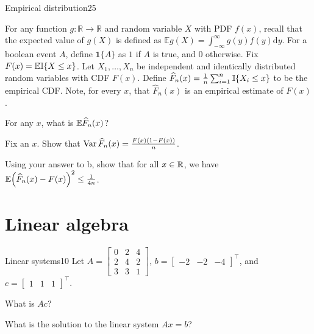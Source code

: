 \documentclass{article}
\begin{document}
\begin{problem}{Empirical distribution}{25}


For any function $g \colon \mathbb{R} \to \mathbb{R}$ and random variable $X$ with PDF $f(x)$, recall that the expected value of $g(X)$ is defined as $\mathbb{E}{g(X)} = \int_{-\infty}^\infty g(y) f(y) \mathrm{d} y$. For a boolean event $A$, define $\mathbf{1}\{ A \}$ as $1$ if $A$ is true, and $0$ otherwise. Fix $F(x) = \mathbb{E}{\mathbb{I}\{X \leq x\}}$. Let $X_1,\ldots,X_n$ be independent and identically distributed random variables with CDF $F(x)$. Define $\widehat{F}_n(x) = \frac{1}{n} \sum_{i=1}^n \mathbb{I}\{X_i \leq x\}$ to be the empirical CDF. Note, for every $x$, that $\widehat{F}_n(x)$ is an empirical estimate of  $F(x)$.

        For any $x$, what is $\mathbb{E}{\widehat{F}_n(x)}$?
       
        Fix an $x$. Show that $\operatorname{Var}{\widehat{F}_n(x)} = \frac{F(x)(1-F(x))}{n}$.
       
        Using your answer to b, show that for all $x\in \mathbb{R}$, we have  $\displaystyle \mathbb{E}{ \left( \widehat{F}_n(x) - F(x) \right)^2 } \leq \tfrac{1}{4n}$.  

    
\end{problem}

\section{Linear algebra}

\begin{problem}{Linear systems}{10}
	Let $A = \begin{bmatrix} 0 & 2 & 4 \\ 2 & 4 & 2 \\ 3 & 3 & 1 \end{bmatrix}$, $b = \begin{bmatrix} -2 & -2 & -4 \end{bmatrix}^\top$, and $c=\begin{bmatrix} 1 & 1 & 1 \end{bmatrix}^\top$.
    
      What is $Ac$?
    
     What is the solution to the linear system $Ax = b$?
    
\end{problem}
\end{document}
